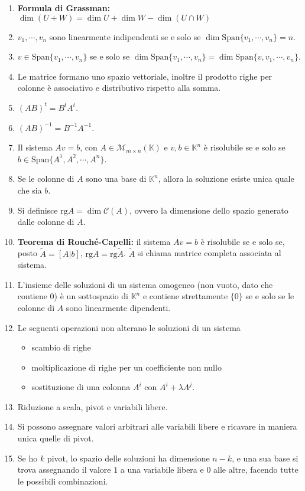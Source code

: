 \documentclass[a4paper,11pt]{article}
\newcommand{\tras}[1]{#1^t}						%
\newcommand{\Span}{\mathrm{Span}}					%
\newcommand{\rg}{\mathrm{rg}}						%
\begin{document}
\begin{enumerate}[resume]
	\item\textbf{Formula di Grassman:} $\dim(U+W)=\dim U+\dim W-\dim (U\cap W)$
	\item $v_1,\cdots,v_n$ sono linearmente indipendenti se e solo se $\dim\Span\{v_1,\cdots,v_n\}=n$.
	\item $v\in\Span\{v_1,\cdots,v_n\}$ se e solo se $\dim\Span\{v_1,\cdots,v_n\}=\dim\Span\{v,v_1,\cdots,v_n\}$.
	\item Le matrice formano uno spazio vettoriale, inoltre il prodotto righe per colonne è associativo e distributivo rispetto alla somma.
	\item $\tras{(AB)}=\tras{B}\tras{A}$.
	\item $(AB)^{-1}=B^{-1}A^{-1}$.
	\item Il sistema $Av=b$, con $A\in\mathcal{M}_{m\times n}(\mathbb{K})$ e $v,b\in \mathbb{K}^n$ è risolubile se e solo se $b\in\Span\{A^1,A^2,\cdots,A^n\}$.
	\item Se le colonne di $A$ sono una base di $\mathbb{K}^n$, allora la soluzione esiste unica quale che sia $b$.
	\item Si definisce $\rg A=\dim\mathcal{C}(A)$, ovvero la dimensione dello spazio generato dalle colonne di $A$.
	\item \textbf{Teorema di Rouché-Capelli:} il sistema $Av=b$ è risolubile se e solo se, posto $\tilde{A}=[A|b]$, $\rg A=\rg\tilde{A}$. $\tilde{A}$ si chiama matrice completa associata al sistema.
	\item L'insieme delle soluzioni di un sistema omogeneo (non vuoto, dato che contiene 0) è un sottospazio di $\mathbb{K}^n$ e contiene strettamente $\{0\}$ se e solo se le colonne di $A$ sono linearmente dipendenti.
	\item Le seguenti operazioni non alterano le soluzioni di un sistema
	\begin{itemize}
		\item scambio di righe
		\item moltiplicazione di righe per un coefficiente non nullo
		\item sostituzione di una colonna $A^i$ con $A^i+\lambda A^j$.
	\end{itemize}
	\item Riduzione a scala, pivot e variabili libere.
	\item Si possono assegnare valori arbitrari alle variabili libere e ricavare in maniera unica quelle di pivot.
	\item Se ho $k$ pivot, lo spazio delle soluzioni ha dimensione $n-k$, e una sua base si trova assegnando il valore $1$ a una variabile libera e $0$ alle altre, facendo tutte le possibili combinazioni.

\end{enumerate}
\end{document}
